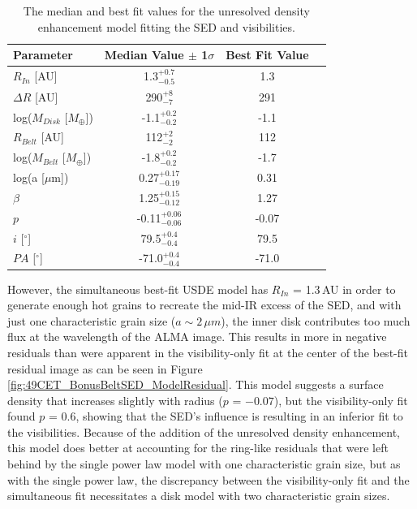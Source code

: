 \begin{table}
\begin{center}
    \def\arraystretch{1.2}%
    \begin{tabular}{l*{2}{c}r}
    \hline
    Parameter & Median Value $\pm$ 1$\sigma$ & Best Fit Value \\ \hline
     $R_{In}$  [AU] & 1.3$^{+0.7}_{-0.5}$ & 1.3\\  
     $\Delta R$ [AU] & 290$^{+8}_{-7}$ & 291\\ 
     log($M_{Disk}$ [$M_{\oplus}$]) & -1.1$^{+0.2}_{-0.2}$ & -1.1 \\
     $R_{Belt}$  [AU] & 112$^{+2}_{-2}$ & 112\\ 
     log($M_{Belt}$ [$M_{\oplus}$]) & -1.8$^{+0.2}_{-0.2}$ & -1.7\\
     log(a [$\mu$m]) & 0.27$^{+0.17}_{-0.19}$ & 0.31\\ 
     $\beta$ & 1.25$^{+0.15}_{-0.12}$ & 1.27\\ 
     $p$ & -0.11$^{+0.06}_{-0.06}$ & -0.07\\ 
     $i$ [$^\circ$] & 79.5$^{+0.4}_{-0.4}$ & 79.5 \\ 
     $PA$ [$^\circ$] & -71.0$^{+0.4}_{-0.4}$ & -71.0\\
    \hline
    \end{tabular}
\end{center}
\caption{The median and best fit values for the unresolved density enhancement model fitting the SED and visibilities.}
\label{tab:49CET_BonusBeltSED_Table}
\end{table}

However, the simultaneous best-fit USDE model has $R_{In}$ = 1.3\,AU in order to generate enough hot grains to recreate the mid-IR excess of the SED, and with just one characteristic grain size ($a \sim 2\,\mu m$), the inner disk contributes too much flux at the wavelength of the ALMA image. This results in more in negative residuals than were apparent in the visibility-only fit at the center of the best-fit residual image as can be seen in Figure \ref{fig:49CET_BonusBeltSED_ModelResidual}. This model suggests a surface density that increases slightly with radius ($p$ = $-0.07$), but the visibility-only fit found $p$ = 0.6, showing that the SED's influence is resulting in an inferior fit to the visibilities. Because of the addition of the unresolved density enhancement, this model does better at accounting for the ring-like residuals that were left behind by the single power law model with one characteristic grain size, but as with the single power law, the discrepancy between the visibility-only fit and the simultaneous fit necessitates a disk model with two characteristic grain sizes. 


